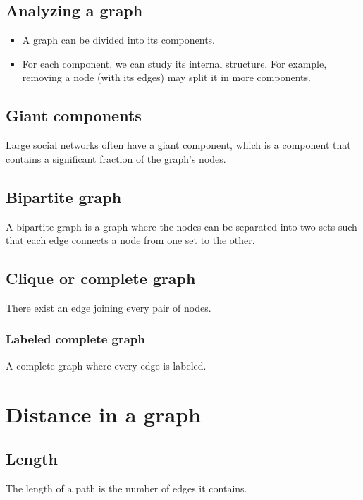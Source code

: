 \subsection{Analyzing a graph}

\begin{itemize}
\item A graph can be divided into its components.
\item For each component, we can study its internal structure. For example, removing a node (with its edges) may split it in more components.
\end{itemize}

\subsection{Giant components}

Large social networks often have a giant component, which is a component that contains a significant fraction of the graph's nodes.

\subsection{Bipartite graph}

A bipartite graph is a graph where the nodes can be separated into two sets such that each edge connects a node from one set to the other.

\subsection{Clique or complete graph}

There exist an edge joining every pair of nodes.

\subsubsection{Labeled complete graph}

A complete graph where every edge is labeled.

\section{Distance in a graph}

\subsection{Length}

The length of a path is the number of edges it contains.

